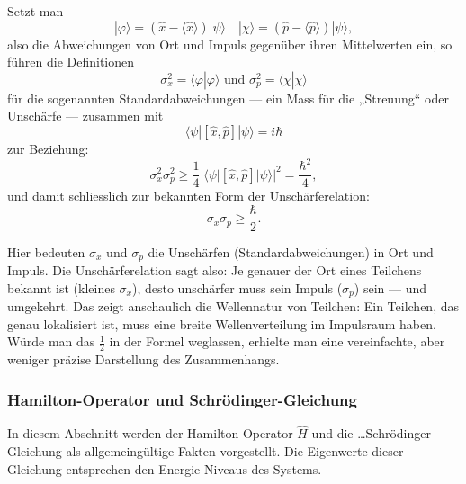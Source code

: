 Setzt man
\begin{equation}
	|\varphi\rangle = (\hat{x} - \langle \hat{x} \rangle) |\psi\rangle \quad |\chi\rangle = (\hat{p} - \langle \hat{p} \rangle) | \psi\rangle,
\end{equation}
also die Abweichungen von Ort und Impuls gegenüber ihren Mittelwerten ein, so führen die Definitionen
\begin{equation}
	\sigma_x^2 = \langle\varphi | \varphi\rangle \text{ und } \sigma_p^2 = \langle\chi | \chi\rangle
\end{equation}
für die sogenannten Standardabweichungen --- ein Mass für die „Streuung“ oder Unschärfe --- zusammen mit
\begin{equation}
	\langle\psi | [\hat{x},\hat{p}] | \psi\rangle = i\hbar
\end{equation}
zur Beziehung:
\begin{equation}
	\sigma_x^2 \sigma_p^2 \ge \frac{1}{4} |\langle\psi | [\hat{x},\hat{p}] | \psi\rangle|^2 = \frac{\hbar^2}{4},
\end{equation}
und damit schliesslich zur bekannten Form der Unschärferelation:
\begin{equation}
	\sigma_x \sigma_p \ge \frac{\hbar}{2}.
\end{equation}

Hier bedeuten $\sigma_x$ und $\sigma_p$ die Unschärfen (Standardabweichungen) in Ort und Impuls.
Die Unschärferelation sagt also:
Je genauer der Ort eines Teilchens bekannt ist (kleines $\sigma_x$), desto unschärfer muss sein Impuls ($\sigma_p$) sein --- und umgekehrt.
Das zeigt anschaulich die Wellennatur von Teilchen:
Ein Teilchen, das genau lokalisiert ist, muss eine breite Wellenverteilung im Impulsraum haben.
Würde man das $\tfrac{1}{2}$ in der Formel weglassen, erhielte man eine vereinfachte, aber weniger präzise Darstellung des Zusammenhangs.

\subsubsection{Hamilton-Operator und Schrödinger-Gleichung%
\label{fourier:subsubsection:hamiltonOperatorUndSchroedinger}} 
In diesem Abschnitt werden der Hamilton-Operator \( \hat{H} \) und die \dots Schrödinger-Gleichung als allgemeingültige Fakten vorgestellt.
Die Eigenwerte dieser Gleichung entsprechen den Energie-Niveaus des Systems. %



